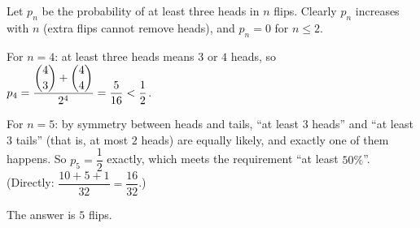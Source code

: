 Let $p_n$ be the probability of at least three heads in $n$ flips. Clearly $p_n$ increases with $n$ (extra flips cannot remove heads), and $p_n=0$ for $n\le2$.

For $n=4$: at least three heads means $3$ or $4$ heads, so $p_4=\dfrac{\dbinom43+\dbinom44}{2^4}=\dfrac{5}{16}<\dfrac{1}{2}$.

For $n=5$: by symmetry between heads and tails, ``at least $3$ heads'' and ``at least $3$ tails'' (that is, at most $2$ heads) are equally likely, and exactly one of them happens. So $p_5=\dfrac{1}{2}$ exactly, which meets the requirement ``at least $50\%$''. (Directly: $\dfrac{10+5+1}{32}=\dfrac{16}{32}$.)

The answer is $\boxed{5}$ flips.
